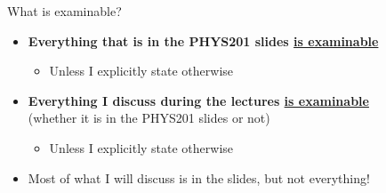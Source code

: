 \begin{frame}{What is examinable?}

\begin{itemize}
  \item {\bf Everything that is in the PHYS201 slides \underline{is examinable}}
  \begin{itemize}
      \item Unless I explicitly state otherwise
  \end{itemize}

  \vspace{0.3cm}

  \item {\bf Everything I discuss during the lectures \underline{is examinable}}\\
        (whether it is in the PHYS201 slides or not)
  \begin{itemize}
      \item Unless I explicitly state otherwise
  \end{itemize}

  \vspace{0.3cm}

  \item Most of what I will discuss is in the slides, but not everything!

\end{itemize}


\end{frame}

